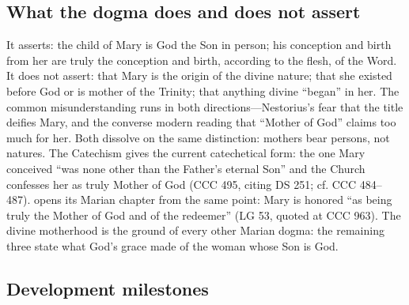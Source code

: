 \subsection*{What the dogma does and does not assert}

It asserts: the child of Mary is God the Son in person; his conception
and birth from her are truly the conception and birth, according to the
flesh, of the Word. It does not assert: that Mary is the origin of the
divine nature; that she existed before God or is mother of the Trinity;
that anything divine ``began'' in her. The common misunderstanding runs
in both directions---Nestorius's fear that the title deifies Mary, and the
converse modern reading that ``Mother of God'' claims too much for her.
Both dissolve on the same distinction: mothers bear persons, not natures.
The Catechism gives the current catechetical form: the one Mary conceived
``was none other than the Father's eternal Son'' and the Church confesses
her as truly Mother of God (CCC 495, citing DS 251; cf. CCC
484--487).  opens its Marian chapter from the same point: Mary is honored
``as being truly the Mother of God and of the redeemer'' (LG 53, quoted
at CCC 963).
The divine motherhood is the ground of every other Marian dogma: the
remaining three state what God's grace made of the woman whose Son is
God.

\subsection*{Development milestones}


